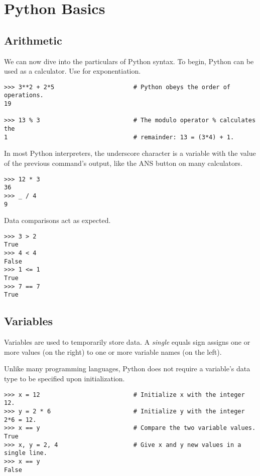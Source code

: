 \section*{Python Basics}

\subsection*{Arithmetic}
We can now dive into the particulars of Python syntax.
To begin, Python can be used as a calculator.
Use \li{**} for exponentiation.

\begin{lstlisting}
>>> 3**2 + 2*5                      # Python obeys the order of operations.
19

>>> 13 % 3                          # The modulo operator % calculates the
1                                   # remainder: 13 = (3*4) + 1. 
\end{lstlisting}
In most Python interpreters, the underscore character \li{\_} is a variable with the value of the previous command's output, like the ANS button on many calculators.

\begin{lstlisting}
>>> 12 * 3
36
>>> _ / 4
9
\end{lstlisting}

Data comparisons act as expected.
\begin{lstlisting}
>>> 3 > 2
True
>>> 4 < 4
False
>>> 1 <= 1
True
>>> 7 == 7
True
\end{lstlisting}

\subsection*{Variables}
Variables are used to temporarily store data.
A \emph{single} equals sign assigns one or more values (on the right) to one or more variable names (on the left).

Unlike many programming languages, Python does not require a variable's data type to be specified upon initialization.

\begin{lstlisting}
>>> x = 12                          # Initialize x with the integer 12.
>>> y = 2 * 6                       # Initialize y with the integer 2*6 = 12.
>>> x == y                          # Compare the two variable values.
True
>>> x, y = 2, 4                     # Give x and y new values in a single line.
>>> x == y
False
\end{lstlisting}
\begin{comment} %
# The 'is' operator checks for object equality. For two variables a and b,
# a 'is' b if a and b refer to the same data at the same location
# in memory. For example, even though x and y have the same numerical value,
# they are not the same object because x is an integer and y is a float,
# meaning they're stored at different locations in memory.
>>> x is y
False                   
\end{comment}

